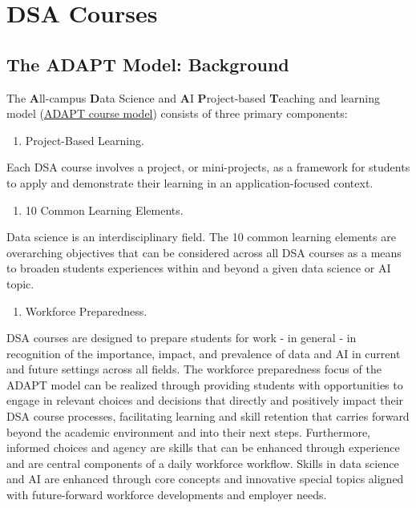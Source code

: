 \documentclass[
  letterpaper,
  DIV=11,
  numbers=noendperiod]{scrreprt}
\providecommand{\tightlist}{%
  \setlength{\itemsep}{0pt}\setlength{\parskip}{0pt}}
\begin{document}
\chapter{DSA Courses}\label{dsa-courses}

\section{The ADAPT Model: Background}\label{the-adapt-model-background}

The \textbf{A}ll-campus \textbf{D}ata Science and \textbf{A}I
\textbf{P}roject-based \textbf{T}eaching and learning model
(\href{https://datascienceacademy.ncsu.edu/courses/course-model/}{ADAPT
course model}) consists of three primary components:

\begin{enumerate}
\def\labelenumi{\arabic{enumi})}
\tightlist
\item
  {Project-Based Learning.}
\end{enumerate}

Each DSA course involves a project, or mini-projects, as a framework for
students to apply and demonstrate their learning in an
application-focused context.

\begin{enumerate}
\def\labelenumi{\arabic{enumi})}
\setcounter{enumi}{1}
\tightlist
\item
  {10 Common Learning Elements.}
\end{enumerate}

Data science is an interdisciplinary field. The 10 common learning
elements are overarching objectives that can be considered across all
DSA courses as a means to broaden students experiences within and beyond
a given data science or AI topic.

\begin{enumerate}
\def\labelenumi{\arabic{enumi})}
\setcounter{enumi}{2}
\tightlist
\item
  {Workforce Preparedness.}
\end{enumerate}

DSA courses are designed to prepare students for work - in general - in
recognition of the importance, impact, and prevalence of data and AI in
current and future settings across all fields. The workforce
preparedness focus of the ADAPT model can be realized through providing
students with opportunities to engage in relevant choices and decisions
that directly and positively impact their DSA course processes,
facilitating learning and skill retention that carries forward beyond
the academic environment and into their next steps. Furthermore,
informed choices and agency are skills that can be enhanced through
experience and are central components of a daily workforce workflow.
Skills in data science and AI are enhanced through core concepts and
innovative special topics aligned with future-forward workforce
developments and employer needs.
\end{document}
